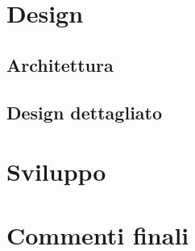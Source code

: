 \documentclass{report}
\begin{document}
\chapter{Design}

\section{Architettura}

\section{Design dettagliato}

\chapter{Sviluppo}

\chapter{Commenti finali}
\end{document}
